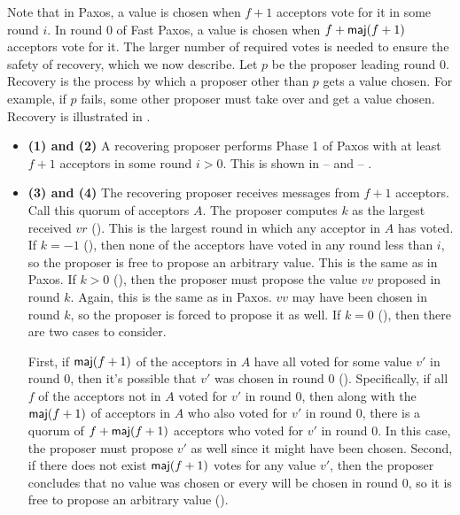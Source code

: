 Note that in Paxos, a value is chosen when $f+1$ acceptors vote for it in some
round $i$. In round $0$ of Fast Paxos, a value is chosen when $f + \textsf{maj}(f+1)$
acceptors vote for it. The larger number of required votes is needed to ensure
the safety of recovery, which we now describe.
%
Let $p$ be the proposer leading round $0$. Recovery is the process by which a
proposer other than $p$ gets a value chosen. For example, if $p$ fails, some
other proposer must take over and get a value chosen. Recovery is illustrated
in .

\begin{itemize}
  \item \textbf{(1) and (2)}
    A recovering proposer performs Phase 1 of Paxos with at least $f+1$
    acceptors in some round $i > 0$. This is shown in
      --
     and 
     -- .

  \item \textbf{(3) and (4)}
    The recovering proposer receives  messages from
    $f+1$ acceptors. Call this quorum of acceptors $A$. The proposer computes
    $k$ as the largest received $vr$ (). This is the largest
    round in which any acceptor in $A$ has voted. If $k = -1$ (),
    then none of the acceptors have voted in any round less than $i$, so the
    proposer is free to propose an arbitrary value. This is the same as in
    Paxos. If $k > 0$ (), then the proposer must propose the value
    $vv$ proposed in round $k$. Again, this is the same as in Paxos. $vv$ may
    have been chosen in round $k$, so the proposer is forced to propose it as
    well. If $k = 0$ (), then there are two cases to consider.

    First, if $\textsf{maj}(f+1)$ of the acceptors in $A$ have all voted for some value
    $v'$ in round $0$, then it's possible that $v'$ was chosen in round $0$
    (). Specifically, if all $f$ of the acceptors not in $A$
    voted for $v'$ in round $0$, then along with the $\textsf{maj}(f+1)$ of acceptors in
    $A$ who also voted for $v'$ in round $0$, there is a quorum of $f +
    \textsf{maj}(f+1)$ acceptors who voted for $v'$ in round $0$. In this case, the
    proposer must propose $v'$ as well since it might have been chosen. Second,
    if there does not exist $\textsf{maj}(f+1)$ votes for any value $v'$, then the
    proposer concludes that no value was chosen or every will be chosen in
    round $0$, so it is free to propose an arbitrary value
    ().


\end{itemize}
